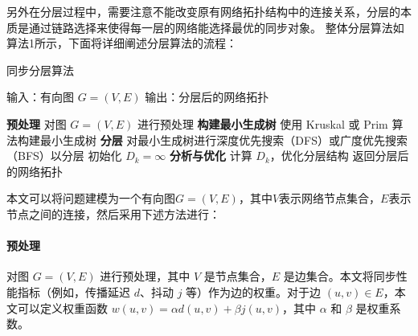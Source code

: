 \documentclass[UTF8,a4paper,12pt]{ctexart}
\numberwithin{equation}{section}
\begin{document}
\begin{figure}[htb]
\end{figure}

另外在分层过程中，需要注意不能改变原有网络拓扑结构中的连接关系，分层的本质是通过链路选择来使得每一层的网络能选择最优的同步对象。
整体分层算法如算法1所示，下面将详细阐述分层算法的流程：
\begin{algorithm}
	\caption{同步分层算法}
	\begin{algorithmic}[1]
		\STATE 输入：有向图 $G=(V, E)$
		\STATE 输出：分层后的网络拓扑
		
		\STATE \textbf{预处理} 对图 $G=(V, E)$ 进行预处理
		\STATE \textbf{构建最小生成树} 使用 Kruskal 或 Prim 算法构建最小生成树
		\STATE \textbf{分层} 对最小生成树进行深度优先搜索（DFS）或广度优先搜索（BFS）以分层
		\STATE 初始化 $D_k = \infty$
		\STATE \textbf{分析与优化} 计算 $D_k$，优化分层结构
		\ENDWHILE
		\STATE 返回分层后的网络拓扑
	\end{algorithmic}
\end{algorithm}

本文可以将问题建模为一个有向图$G=(V, E)$，其中$V$表示网络节点集合，$E$表示节点之间的连接，然后采用下述方法进行：
\paragraph{预处理}对图 $G=(V,E)$ 进行预处理，其中 $V$ 是节点集合，$E$ 是边集合。本文将同步性能指标（例如，传播延迟 $d$、抖动 $j$ 等）作为边的权重。对于边 $(u, v) \in E$，本文可以定义权重函数 $w(u, v) = \alpha d(u, v) + \beta j(u, v)$，其中 $\alpha$ 和 $\beta$ 是权重系数。
\end{document}
